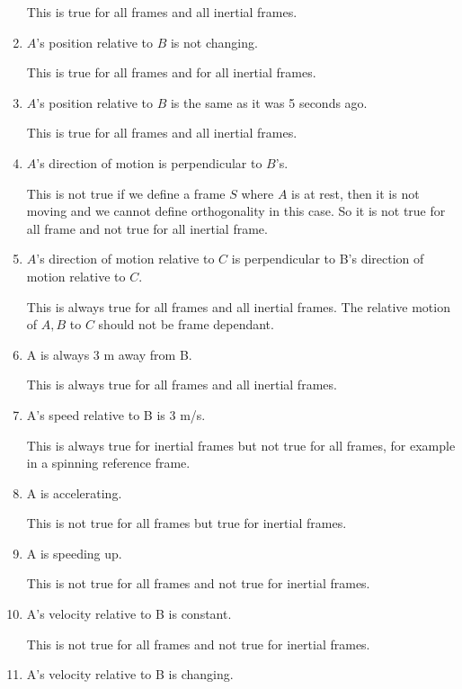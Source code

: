 \documentclass[12pt]{article}
\begin{document}
\begin{enumerate}
    This is true for all frames and all inertial frames.

    \item $A$'s position relative to $B$ is not changing. 

    This is true for all frames and for all inertial frames. 

    \item $A$’s position relative to $B$ is the same as it was 5 seconds ago.

    This is true for all frames and all inertial frames. 

    \item $A$’s direction of motion is perpendicular to $B$’s.

    This is not true if we define a frame $S$ where $A$ is at rest, then it is not moving and we cannot define orthogonality in this case. So it is not true for all frame and not true for all inertial frame. 

    \item $A$’s direction of motion relative to $C$ is perpendicular to B’s direction of motion relative to $C$.

    This is always true for all frames and all inertial frames. The relative motion of $A,B$ to $C$ should not be frame dependant. 

    \item A is always 3 m away from B.
    
    This is always true for all frames and all inertial frames. 

    \item A’s speed relative to B is 3 m/s.
    
    This is always true for inertial frames but not true for all frames, for example in a spinning reference frame.

    \item A is accelerating.
    
    This is not true for all frames but true for inertial frames.

    \item A is speeding up.
    
    This is not true for all frames and not true for inertial frames.

    \item A’s velocity relative to B is constant.
    
    This is not true for all frames and not true for inertial frames.

    \item A’s velocity relative to B is changing.
    

\end{enumerate}
\end{document}
